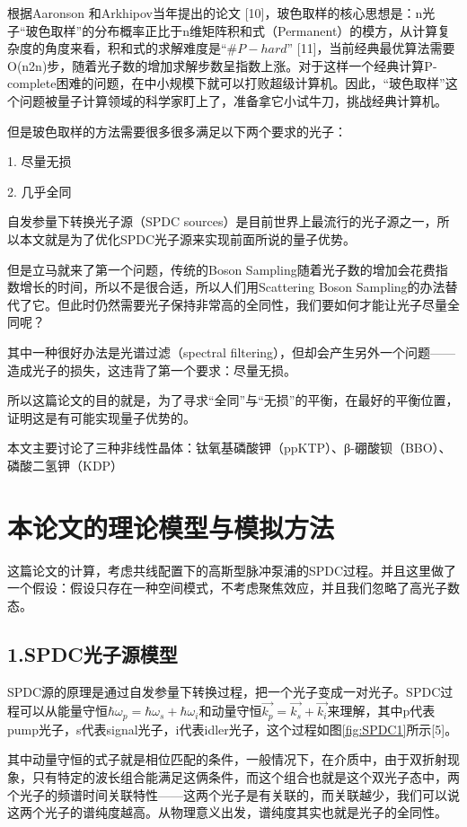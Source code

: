 根据Aaronson 和Arkhipov当年提出的论文 [10]，玻色取样的核心思想是：n光子“玻色取样”的分布概率正比于n维矩阵积和式（Permanent）的模方，从计算复杂度的角度来看，积和式的求解难度是“$\#P-hard$” [11]，当前经典最优算法需要O(n2n)步，随着光子数的增加求解步数呈指数上涨。对于这样一个经典计算P-complete困难的问题，在中小规模下就可以打败超级计算机。因此，“玻色取样”这个问题被量子计算领域的科学家盯上了，准备拿它小试牛刀，挑战经典计算机。

但是玻色取样的方法需要很多很多满足以下两个要求的光子：

1.	尽量无损

2.	几乎全同

自发参量下转换光子源（SPDC sources）是目前世界上最流行的光子源之一，所以本文就是为了优化SPDC光子源来实现前面所说的量子优势。

但是立马就来了第一个问题，传统的Boson Sampling随着光子数的增加会花费指数增长的时间，所以不是很合适，所以人们用Scattering Boson Sampling的办法替代了它。但此时仍然需要光子保持非常高的全同性，我们要如何才能让光子尽量全同呢？

其中一种很好办法是光谱过滤（spectral filtering），但却会产生另外一个问题——造成光子的损失，这违背了第一个要求：尽量无损。

所以这篇论文的目的就是，为了寻求“全同”与“无损”的平衡，在最好的平衡位置，证明这是有可能实现量子优势的。

本文主要讨论了三种非线性晶体：钛氧基磷酸钾（ppKTP）、β-硼酸钡（BBO）、磷酸二氢钾（KDP）




\section{本论文的理论模型与模拟方法}
这篇论文的计算，考虑共线配置下的高斯型脉冲泵浦的SPDC过程。并且这里做了一个假设：假设只存在一种空间模式，不考虑聚焦效应，并且我们忽略了高光子数态。
\subsection{1.SPDC光子源模型}

SPDC源的原理是通过自发参量下转换过程，把一个光子变成一对光子。SPDC过程可以从能量守恒$\hbar\omega_p=\hbar\omega_s+\hbar\omega_i$和动量守恒$\vec{k_p}=\vec{k_s}+\vec{k_i}$来理解，其中p代表pump光子，s代表signal光子，i代表idler光子，这个过程如图\ref{fig:SPDC1}所示[5]。


其中动量守恒的式子就是相位匹配的条件，一般情况下，在介质中，由于双折射现象，只有特定的波长组合能满足这俩条件，而这个组合也就是这个双光子态中，两个光子的频谱时间关联特性——这两个光子是有关联的，而关联越少，我们可以说这两个光子的谱纯度越高。从物理意义出发，谱纯度其实也就是光子的全同性。

